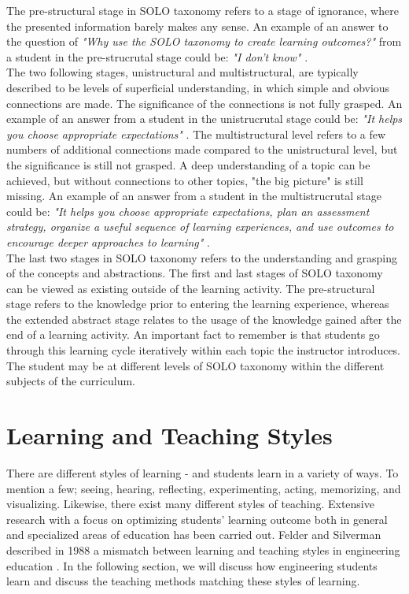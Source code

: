 \noindent 
The pre-structural stage in SOLO taxonomy refers to a stage of ignorance, where the presented information barely makes any sense. An example of an answer to the question of \textit{"Why use the SOLO taxonomy to create learning outcomes?"} from a student in the pre-strucrutal stage could be: \textit{"I don't know"} \cite[p. 10]{potter2012primer}. \\

\noindent
 The two following stages, unistructural and multistructural, are typically described to be levels of superficial understanding, in which simple and obvious connections are made. The significance of the connections is not fully grasped.
An example of an answer from a student in the unistrucrutal stage could be: \textit{"It helps you choose appropriate expectations"} \cite[p. 11]{potter2012primer}. The multistructural level refers to a few numbers of additional connections made compared to the unistructural level, but the significance is still not grasped. A deep understanding of a topic can be achieved, but without connections to other topics, "the big picture" is still missing. 
An example of an answer from a student in the multistrucrutal stage could be: \textit{"It helps you choose appropriate expectations, plan an assessment strategy, organize a useful sequence of learning experiences, and use outcomes to encourage deeper approaches to learning"} \cite[p. 12]{potter2012primer}. \\

\noindent
The last two stages in SOLO taxonomy refers to the understanding and grasping of the concepts and abstractions. The first and last stages of SOLO taxonomy can be viewed as existing outside of the learning activity. The pre-structural stage refers to the knowledge prior to entering the learning experience, whereas the extended abstract stage relates to the usage of the knowledge gained after the end of a learning activity. An important fact to remember is that students go through this learning cycle iteratively within each topic the instructor introduces. The student may be at different levels of SOLO taxonomy within the different subjects of the curriculum.

\section{Learning and Teaching Styles}
\label{section:learning_styles}

There are different styles of learning - and students learn in a variety of ways. To mention a few; seeing, hearing, reflecting, experimenting, acting, memorizing, and visualizing. Likewise, there exist many different styles of teaching. Extensive research with a focus on optimizing students' learning outcome both in general and specialized areas of education has been carried out. Felder and Silverman described in 1988 a mismatch between learning and teaching styles in engineering education \cite[p. 674]{Felder88k.:learning}. In the following section, we will discuss how engineering students learn and discuss the teaching methods matching these styles of learning.

